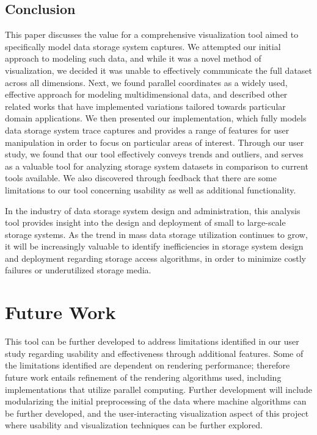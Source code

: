 \documentclass[12pt]{ucthesis}
\begin{document}
\section{Conclusion}
This paper discusses the value for a comprehensive visualization tool aimed to specifically model data storage system captures. We attempted our initial approach to modeling such data, and while it was a novel method of visualization, we decided it was unable to effectively communicate the full dataset across all dimensions. Next, we found parallel coordinates as a widely used, effective approach for modeling multidimensional data, and described other related works that have implemented variations tailored towards particular domain applications. We then presented our implementation, which fully models data storage system trace captures and provides a range of features for user manipulation in order to focus on particular areas of interest. Through our user study, we found that our tool effectively conveys trends and outliers, and serves as a valuable tool for analyzing storage system datasets in comparison to current tools available. We also discovered through feedback that there are some limitations to our tool concerning usability as well as additional functionality.

In the industry of data storage system design and administration, this analysis tool provides insight into the design and deployment of small to large-scale storage systems. As the trend in mass data storage utilization continues to grow, it will be increasingly valuable to identify inefficiencies in storage system design and deployment regarding storage access algorithms, in order to minimize costly failures or underutilized storage media.

\chapter{Future Work}
\label{future_work}
This tool can be further developed to address limitations identified in our user study regarding usability and effectiveness through additional features. Some of the limitations identified are dependent on rendering performance; therefore future work entails refinement of the rendering algorithms used, including implementations that utilize parallel computing. Further development will include modularizing the initial preprocessing of the data where machine algorithms can be further developed, and the user-interacting visualization aspect of this project where usability and visualization techniques can be further explored.
\end{document}
